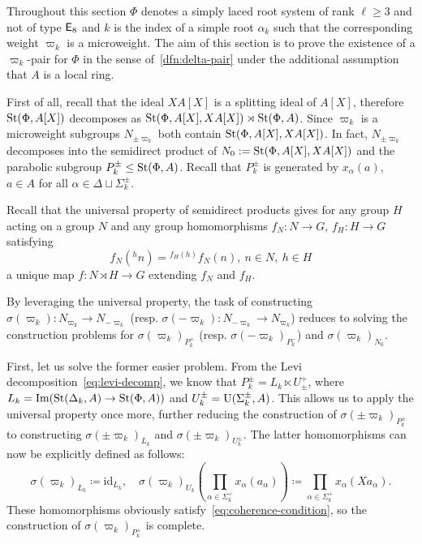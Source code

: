 Throughout this section $\Phi$ denotes a simply laced root system of rank $\ell \geq 3$ and not of type $\mathsf{E}_8$ and $k$ is the index of
 a simple root $\alpha_k$ such that the corresponding weight $\varpi_k$ is a microweight.
The aim of this section is to prove the existence of a $\varpi_k$-pair for $\Phi$ in the sense of~\cref{dfn:delta-pair}
 under the additional assumption that $A$ is a local ring.

First of all, recall that the ideal $XA[X]$ is a splitting ideal of $A[X]$, therefore
$\operatorname{St}(\Phi, A[X])$ decomposes as $\operatorname{St}(\Phi, A[X], XA[X]) \rtimes \operatorname{St}(\Phi, A)$.
Since $\varpi_k$ is a microweight subgroups $N_{\pm \varpi_k}$ both contain $\operatorname{St}(\Phi, A[X], XA[X])$.
In fact, $N_{\pm \varpi_k}$ decomposes into the semidirect product of $N_0 := \operatorname{St}(\Phi, A[X], XA[X])$ and the parabolic subgroup $P_k^\pm \leq \operatorname{St}(\Phi, A)$.
Recall that $P_k^\pm$ is generated by $x_\alpha(a)$, $a \in A$ for all $\alpha \in \Delta \sqcup \Sigma^\pm_k$.

Recall that the universal property of semidirect products gives for any group $H$ acting on a group $N$
and any group homomorphisms $f_N\colon N \to G$, $f_H\colon H \to G$ satisfying
\begin{equation}
    \label{eq:coherence-condition} f_N({}^hn) = {}^{f_H(h)} f_N(n),\ n\in N,\ h\in H
\end{equation}
a unique map $f\colon N \rtimes H \to G$ extending $f_N$ and $f_H$.

By leveraging the universal property, the task of constructing \( \sigma(\varpi_k) \colon N_{\varpi_k} \to N_{-\varpi_k} \)
(resp. $\sigma(-\varpi_k) \colon N_{-\varpi_k} \to N_{\varpi_k}$)
 reduces to solving the construction problems for \( \sigma(\varpi_k)_{P_k^+} \) (resp. $\sigma(-\varpi_k)_{P_k^-}$) and \( \sigma(\varpi_k)_{N_0} \).

First, let us solve the former easier problem.
From the Levi decomposition~\eqref{eq:levi-decomp}, we know that \( P_k^\pm = L_k \ltimes U_\pm^+ \), where \( L_k = \mathrm{Im}(\operatorname{St}(\Delta_k, A) \to \operatorname{St}(\Phi, A)) \) and \( U_k^\pm = \operatorname{U}(\Sigma_k^\pm, A) \).
This allows us to apply the universal property once more, further reducing the construction of \( \sigma(\pm \varpi_k)_{P_k^\pm} \) to constructing \( \sigma(\pm\varpi_k)_{L_k} \) and \( \sigma(\pm\varpi_k)_{U_k^\pm} \).
The latter homomorphisms can now be explicitly defined as follows:
\[\sigma(\varpi_k)_{L_k} \coloneqq \mathrm{id}_{L_k}, \quad
  \sigma(\varpi_k)_{U_k} \left(\textstyle\prod_{\alpha \in \Sigma_k^+} x_\alpha(a_\alpha)\right) \coloneqq \textstyle\prod_{\alpha \in \Sigma_k^+} x_\alpha(Xa_\alpha).\]
These homomorphisms obviously satisfy~\eqref{eq:coherence-condition}, so the construction of \( \sigma(\varpi_k)_{P_k^+} \) is complete.

